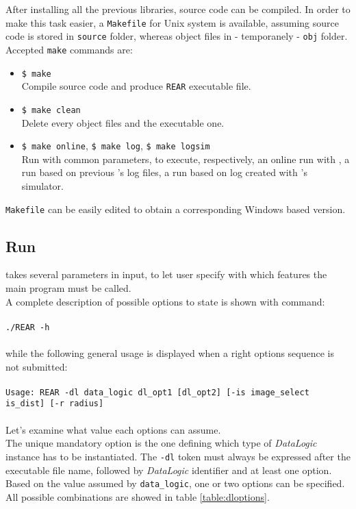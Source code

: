 After installing all the previous libraries, \framework{}
source code can be compiled. In order to make this
task easier, a \texttt{Makefile} for Unix system
is available, assuming source code is stored in
\texttt{source} folder, whereas object files in - 
temporanely - \texttt{obj} folder.
\\
Accepted \texttt{make} commands are: 

\begin{itemize}

  \item \texttt{\$ make} \\
    Compile source code and produce \texttt{REAR} executable
    file.

  \item \texttt{\$ make clean} \\
    Delete every object files and the executable one.

  \item \texttt{\$ make online}, \texttt{\$ make log}, \texttt{\$ make logsim} \\
    Run \framework{} with common parameters, to execute, respectively,
    an online run with \morduc{}, a run based on previous \morduc{}'s log files,
    a run based on log created with \morduc{}'s simulator.

\end{itemize}

\texttt{Makefile} can be easily edited to obtain a corresponding
Windows based version.


\subsection{Run \framework{}}
\label{sourcecode:downloadrun:run}

\framework{} takes several parameters in input, to let
user specify with which features the main program must be called. 
\\
A complete description of possible options to state is
shown with command:
\\
\\
\texttt{./REAR -h}
\\
\\
while the following general usage is displayed when a right options sequence
is not submitted:
\\
\\
\texttt{Usage: REAR -dl data\_logic dl\_opt1 [dl\_opt2]
  [-is image\_select is\_dist] [-r radius]}
\\
\\
Let's examine what value each options can assume.
\\
The unique mandatory option is the one defining which type
of \textit{DataLogic} instance has to be instantiated. The
\texttt{-dl} token must always be expressed after the
executable file name, followed by \textit{DataLogic} identifier
and at least one option.
\\
Based on the value assumed by \texttt{data\_logic}, one or
two options can be specified. All possible combinations
are showed in table \ref{table:dloptions}.

